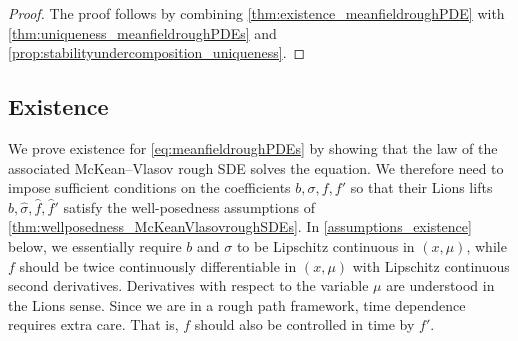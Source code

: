 \documentclass[10pt, a4paper]{article} %
\theoremstyle{definition}
\theoremstyle{plain}
\begin{document}
\begin{proof}
    The proof follows by combining \cref{thm:existence_meanfieldroughPDE} with \cref{thm:uniqueness_meanfieldroughPDEs} and \cref{prop:stabilityundercomposition_uniqueness}. 
\end{proof}



\subsection{Existence} \label{section:existence}
{
We prove existence for \eqref{eq:meanfieldroughPDEs} by showing that the law of the associated McKean--Vlasov rough SDE solves the equation. 
We therefore need to impose sufficient conditions on the coefficients $b,\sigma,f,f'$ so that their Lions lifts $\hat b, \hat \sigma, \hat f, \hat f'$ satisfy the well-posedness assumptions of \cref{thm:wellposedness_McKeanVlasovroughSDEs}. 
In \cref{assumptions_existence} below, we essentially require $b$ and $\sigma$ to be Lipschitz continuous in $(x,\mu)$, while $f$ should be twice continuously differentiable in $(x,\mu)$ with Lipschitz continuous second derivatives. Derivatives with respect to the variable $\mu$ are understood in the Lions sense. 
Since we are in a rough path framework,  time dependence requires extra care. That is, $f$ should also be controlled in time by $f'$. 
}
\end{document}

